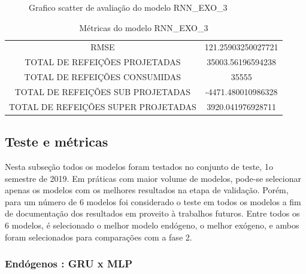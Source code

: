 \documentclass[	12pt, Times, openright, twoside, a4paper, english, brazil]{abntex2}
\begin{document}
{\begin{center}
\begin{minipage}[b]{0.45\textwidth}
\begin{figure}[H]
{                  }
                  \caption{Grafico scatter de avaliação do modelo RNN\_EXO\_3 \label{fig:case1_rnn_exo_3_val_scatter} }
                \end{figure} \end{minipage}
                \end{center} }
                
                
                
                
                
                 \begin{table}[!ht]
                \centering
                \caption{Métricas do modelo  RNN\_EXO\_3 }
                 \begin{tabular}{|c|c|}
                     \rowcolor{gray!50}
                     \hline
                     \multicolumn{2}{c}{ METRICAS DO MODELO RNN\_EXO\_3 : } \\ \hline
                        RMSE & 121.25903250027721\\
                        TOTAL DE REFEIÇÕES PROJETADAS & 35003.56196594238\\
                        TOTAL DE REFEIÇÕES CONSUMIDAS &  35555\\
                        TOTAL DE REFEIÇÕES SUB PROJETADAS & -4471.480010986328\\
                        TOTAL DE REFEIÇÕES SUPER PROJETADAS & 3920.041976928711 \\ \hline 
                \end{tabular} \end{table}
        
    	\subsection{Teste e métricas}
    	    Nesta subseção todos os modelos foram testados no conjunto de teste, 1o semestre de 2019. Em práticas com maior volume de modelos, pode-se selecionar apenas os modelos com os melhores resultados na etapa de validação. Porém, para um número de 6 modelos foi considerado o teste em todos os modelos a fim de documentação dos resultados em proveito à trabalhos futuros. 
    	    Entre todos os 6 modelos, é selecionado o melhor modelo endógeno, o melhor exógeno, e ambos foram selecionados para comparações com a fase 2.
    	    
    	    \subsubsection{Endógenos : GRU x MLP}
    	    
\end{document}
